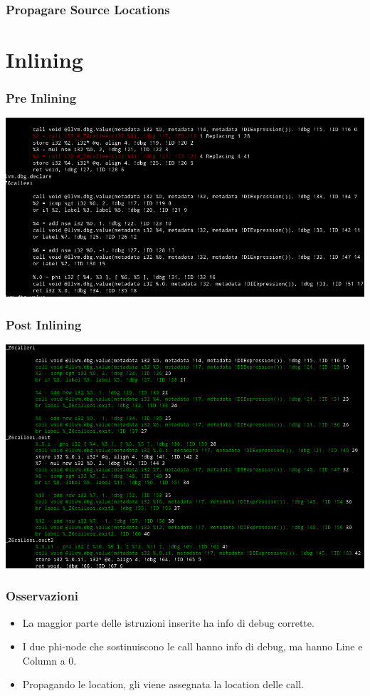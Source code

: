 \documentclass{beamer}
\begin{document}
\begin{frame}
\frametitle{Propagare Source Locations}

\end{frame}

\section{Inlining}

\begin{frame}
\frametitle{Pre Inlining}
\includegraphics[scale=0.35]{pre_inline.png}
\end{frame}

\begin{frame}
\frametitle{Post Inlining}
\includegraphics[scale=0.35]{post_inline.png}
\end{frame}

\begin{frame}
\frametitle{Osservazioni}
\begin{itemize}
\item La maggior parte delle istruzioni inserite ha info di debug corrette.
\item I due phi-node che sostinuiscono le call hanno info di debug, ma hanno Line e Column a 0.
\item Propagando le location, gli viene assegnata la location delle call.
\end{itemize}
\end{frame}
\end{document}
